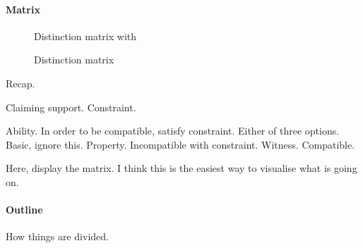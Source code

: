 \paragraph{Matrix}

\begin{note}
  \begin{figure}[H]
    \centering
    \saMtxInterpreted{}
    \caption{Distinction matrix with }
    \label{fig:saMtxInterpreted:outline}
  \end{figure}
\end{note}

\begin{note}
  \begin{figure}[H]
    \centering
    \saMtxRuledOut{}
    \caption{Distinction matrix}
    \label{fig:saMtxRuledOut:outline}
  \end{figure}
\end{note}

\begin{note}
  Recap.

  Claiming support.
  Constraint.

  Ability.
  In order to be compatible, satisfy constraint.
  Either of three options.
  Basic, ignore this.
  Property. Incompatible with constraint.
  Witness. Compatible.

  Here, display the matrix.
  I think this is the easiest way to visualise what is going on.
\end{note}

\paragraph{Outline}

\begin{note}
  How things are divided.
\end{note}

